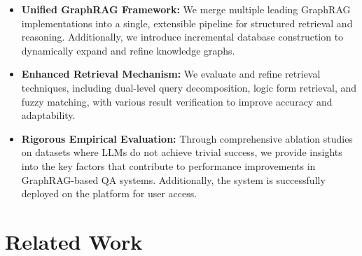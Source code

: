\documentclass[11pt]{article}
\begin{document}
\begin{itemize}[noitemsep, topsep=0pt, leftmargin=*]
    \item \textbf{Unified GraphRAG Framework:} We merge multiple leading GraphRAG implementations into a single, extensible pipeline for structured retrieval and reasoning. Additionally, we introduce incremental database construction to dynamically expand and refine knowledge graphs.
    \item \textbf{Enhanced Retrieval Mechanism:} We evaluate and refine retrieval techniques, including dual-level query decomposition, logic form retrieval, and fuzzy matching, with various result verification to improve accuracy and adaptability.
    \item \textbf{Rigorous Empirical Evaluation:} Through comprehensive ablation studies on datasets where LLMs do not achieve trivial success, we provide insights into the key factors that contribute to performance improvements in GraphRAG-based QA systems. Additionally, the system is successfully deployed on the platform for user access.
\end{itemize}


\section{Related Work}
\label{sec:related}
\end{document}
